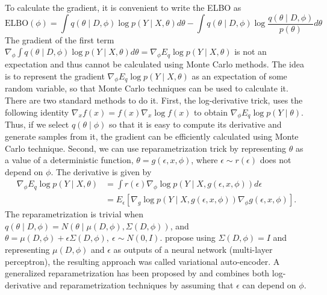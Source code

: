 \documentclass[12pt]{article}
\begin{document}
To calculate the gradient, it is convenient to write the ELBO as
\[
\text{ELBO}(\phi) = \int q(\theta \mid D, \phi)\log p(Y\mid X,\theta)d\theta - \int q(\theta \mid D,\phi) \log \dfrac{q(\theta\mid D, \phi)}{p(\theta)}d\theta
\]
The gradient of the first term $\nabla_{\phi}\int q(\theta \mid D, \phi)\log p(Y\mid X,\theta)d\theta = \nabla_{\phi}E_q\log p(Y\mid X,\theta)$ is not an expectation and thus cannot be calculated using Monte Carlo methods. The idea is to represent the gradient $\nabla_{\phi} E_q\log p(Y\mid X,\theta)$ as an expectation of some random variable, so that Monte Carlo techniques can be used to calculate it. There are two standard methods to do it. First, the log-derivative trick, uses the following identity $\nabla_x f(x) = f(x) \nabla_x \log f(x)$ to obtain $\nabla_{\phi} E_q\log p(Y\mid \theta)$.
Thus, if we select $q(\theta \mid\phi)$ so that it is easy to compute its derivative and generate samples from it, the gradient can be efficiently calculated using Monte Carlo technique.  Second, we can use reparametrization trick by representing $\theta$ as a value of a deterministic function,  $\theta = g(\epsilon,x,\phi)$, where $\epsilon \sim r(\epsilon)$ does not depend on $\phi$. The derivative is given by
\begin{align*}
\nabla_{\phi} E_q\log p(Y\mid X, \theta) &= \int r(\epsilon)\nabla_{\phi}\log p(Y\mid  X, g(\epsilon,x,\phi))d \epsilon\\
& = E_{\epsilon} [\nabla_{g}\log p(Y\mid X, g(\epsilon,x,\phi))\nabla_{\phi}g(\epsilon,x,\phi)].
\end{align*}
The reparametrization is trivial when $q(\theta \mid D,\phi) = N(\theta \mid \mu(D,\phi), \Sigma(D,\phi))$, and $\theta = \mu(D,\phi)  + \epsilon\Sigma(D,\phi),~\epsilon\sim N(0,I)$. \cite{kingma2013auto}  propose using $\Sigma(D,\phi) = I$ and representing $\mu(D,\phi)$ and $\epsilon$ as outputs of a neural network (multi-layer perceptron), the resulting approach was called variational auto-encoder. A generalized reparametrization has been proposed by \cite{ruiz2016generalized} and combines both log-derivative and reparametrization techniques by  assuming that $\epsilon$ can depend on $\phi$. 
\end{document}
